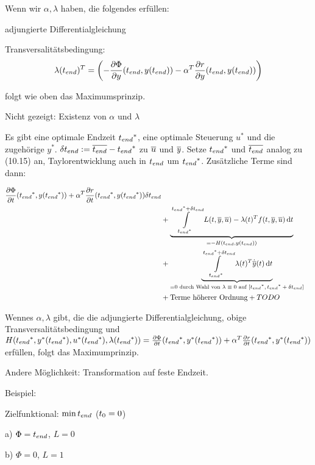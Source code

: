 Wenn wir $\alpha, \lambda$ haben, die folgendes erfüllen:

\bitm
\item adjungierte Differentialgleichung
\item Transversalitätsbedingung: \[ \lambda({t_{end}})^T = \left( -\frac{\partial \Phi}{\partial y} ({t_{end}}, y({t_{end}})) - \alpha^T \frac{\partial r}{\partial y} ({t_{end}}, y({t_{end}}))\right) \]
\eitm

folgt wie oben das Maximumsprinzip.

Nicht gezeigt: Existenz von $\alpha$ und $\lambda$


Es gibt eine optimale Endzeit ${t_{end}}^*$, eine optimale Steuerung $u^*$ und die zugehörige $y^*$.
$\delta {t_{end}} := \overline {{t_{end}}} - {t_{end}}^*$
zu $\overline u$ und $\overline y$. Setze ${t_{end}}^*$ und $\overline {{t_{end}}}$ analog zu (10.15) an, Taylorentwicklung auch in ${t_{end}}$ um ${t_{end}}^*$. Zusätzliche Terme sind dann:


\begin{align*}
\frac{\partial \Phi}{\partial t} ({t_{end}}^*, y({t_{end}}^*)) + \alpha^T \frac{\partial r}{\partial t} ({t_{end}}^*, y({t_{end}}^*)) \delta {t_{end}} \\
&+ \underbrace{\int\limits_{{t_{end}}^*}^{{t_{end}}^*+\delta{t_{end}}} L(t,\overline y, \overline u) - \lambda(t)^T f(t, \overline y, \overline u) \,\mathrm d t}_{= - H({t_{end}}, y({t_{end}}))} \\
&+ \underbrace{\int\limits_{{t_{end}}^*}^{{t_{end}}^*+\delta{t_{end}}}\lambda(t)^T \dot{\overline y}(t) \,\mathrm d t}_{= 0 \text{ durch Wahl von $\lambda\equiv 0$ auf $[{t_{end}}^*, {t_{end}}^*+\delta{t_{end}}]$}} \\
&+ \text{Terme höherer Ordnung} + TODO
\end{align*}

Wennes $\alpha, \lambda$ gibt, die die adjungierte Differentialgleichung, obige Transversalitätsbedingung und $H({t_{end}}^*, y^*({t_{end}}^*),u^*({t_{end}}^*),\lambda({t_{end}}^*)) = \frac{\partial \Phi}{\partial t} ({t_{end}}^*, y^*({t_{end}}^*)) + \alpha^T \frac{\partial r}{\partial t} ({t_{end}}^*, y^*({t_{end}}^*))$ erfüllen, folgt das Maximumprinzip.

Andere Möglichkeit: Transformation auf feste Endzeit.

Beispiel:

Zielfunktional: $\min {t_{end}}$ (${t_0} = 0$)

\bitm
\item a) $\Phi = {t_{end}}$, $L=0$
\item b) $\Phi = 0$, $L=1$
\eitm

